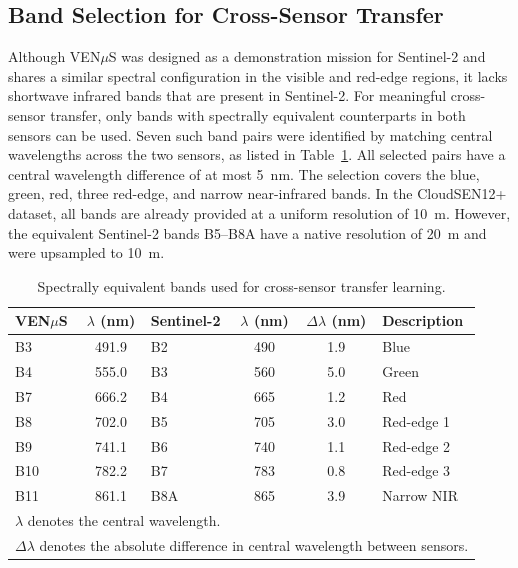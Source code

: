 \subsection{Band Selection for Cross-Sensor Transfer}
\label{sec:band_selection}

Although VEN$\mu$S was designed as a demonstration mission for Sentinel-2 \cite{hagolle2025cnes} and shares a similar spectral configuration in the visible and red-edge regions, it lacks shortwave infrared bands that are present in Sentinel-2. For meaningful cross-sensor transfer, only bands with spectrally equivalent counterparts in both sensors can be used. Seven such band pairs were identified by matching central wavelengths across the two sensors, as listed in Table~\ref{tab:equivalent_bands}. All selected pairs have a central wavelength difference of at most 5~nm. The selection covers the blue, green, red, three red-edge, and narrow near-infrared bands. In the CloudSEN12+ dataset, all bands are already provided at a uniform resolution of 10~m. However, the equivalent Sentinel-2 bands B5--B8A have a native resolution of 20~m and were upsampled to 10~m. 

\begin{table}[H]
\small
\centering
\caption{Spectrally equivalent bands used for cross-sensor 
transfer learning.}
\label{tab:equivalent_bands}
\small
\begin{tabular}{lc|lc|cl}
\toprule
\textbf{VEN$\mu$S} & \textbf{$\lambda$ (nm)} & \textbf{Sentinel-2} & 
\textbf{$\lambda$ (nm)} & \textbf{$\Delta\lambda$ (nm)} & 
\textbf{Description} \\
\midrule
B3  & 491.9 & B2  & 490 & 1.9 & Blue \\
B4  & 555.0 & B3  & 560 & 5.0 & Green \\
B7  & 666.2 & B4  & 665 & 1.2 & Red \\
B8  & 702.0 & B5  & 705 & 3.0 & Red-edge 1 \\
B9  & 741.1 & B6  & 740 & 1.1 & Red-edge 2 \\
B10 & 782.2 & B7  & 783 & 0.8 & Red-edge 3 \\
B11 & 861.1 & B8A & 865 & 3.9 & Narrow NIR \\
\bottomrule
\multicolumn{6}{l}{\footnotesize $\lambda$ denotes the central wavelength.}\\
\multicolumn{6}{l}{\footnotesize $\Delta\lambda$ denotes the 
absolute difference in central wavelength between sensors.}\\
\end{tabular}
\end{table}


